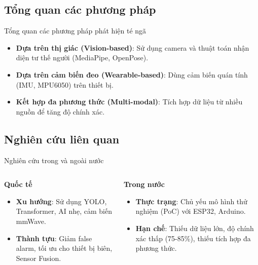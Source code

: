 \subsection{Tổng quan các phương pháp}
\begin{frame}{Tổng quan các phương pháp phát hiện té ngã}
    \begin{itemize}
        \item \textbf{Dựa trên thị giác (Vision-based)}: Sử dụng camera và thuật toán nhận diện tư thế người (MediaPipe, OpenPose).
        \item \textbf{Dựa trên cảm biến đeo (Wearable-based)}: Dùng cảm biến quán tính (IMU, MPU6050) trên thiết bị.
        \item \textbf{Kết hợp đa phương thức (Multi-modal)}: Tích hợp dữ liệu từ nhiều nguồn để tăng độ chính xác.
    \end{itemize}
\end{frame}

\subsection{Nghiên cứu liên quan}
\begin{frame}{Nghiên cứu trong và ngoài nước}
    \begin{columns}[T]
        \begin{column}{0.48\textwidth}
            \textbf{Quốc tế}
            \begin{itemize}
                \item \textbf{Xu hướng}: Sử dụng YOLO, Transformer, AI nhẹ, cảm biến mmWave.
                \item \textbf{Thành tựu}: Giảm false alarm, tối ưu cho thiết bị biên, Sensor Fusion.
            \end{itemize}
        \end{column}
        \begin{column}{0.48\textwidth}
            \textbf{Trong nước}
            \begin{itemize}
                \item \textbf{Thực trạng}: Chủ yếu mô hình thử nghiệm (PoC) với ESP32, Arduino.
                \item \textbf{Hạn chế}: Thiếu dữ liệu lớn, độ chính xác thấp (75-85\%), thiếu tích hợp đa phương thức.
            \end{itemize}
        \end{column}
    \end{columns}
\end{frame}

